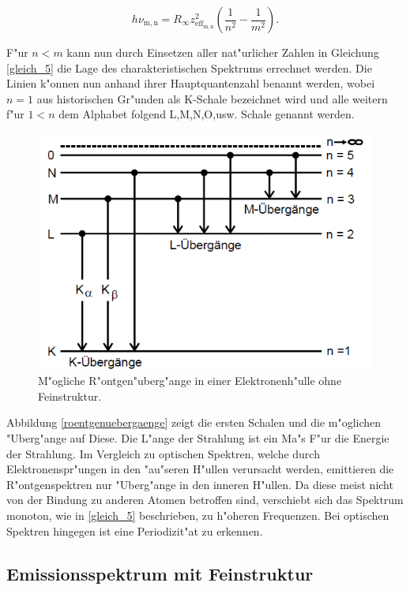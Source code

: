 		\begin{equation}
			h \nu_\mathrm{m,n} = R_\infty z_{\mathrm{eff}_\mathrm{m,n}}^2 \left( \frac{1}{n^2} - \frac{1}{m^2} \right). \label{gleich_5}
		\end{equation}

		F"ur $n < m$ kann nun durch Einsetzen aller nat"urlicher Zahlen in Gleichung \eqref{gleich_5} die Lage des charakteristischen Spektrums errechnet werden.
		Die Linien k"onnen nun anhand ihrer Hauptquantenzahl benannt werden, wobei $n = 1$ aus historischen Gr"unden als K-Schale bezeichnet wird und alle weitern f"ur $1 < n$ dem Alphabet folgend L,M,N,O,usw. Schale genannt werden. 

		\begin{figure}[htbp]
			\centering
			\includegraphics[width = 12cm]{img/Roentgenuebergaenge.png}
			\caption{M"ogliche R"ontgen"uberg"ange in einer Elektronenh"ulle ohne Feinstruktur.}
			\label{roentgenuebergaenge}
		\end{figure}

		Abbildung \eqref{roentgenuebergaenge} zeigt die ersten Schalen und die m"oglichen "Uberg"ange auf Diese. Die L"ange der Strahlung ist ein Ma"s F"ur die Energie der Strahlung.
		Im Vergleich zu optischen Spektren, welche durch Elektronenspr"ungen in den "au"seren H"ullen verursacht werden, emittieren die R"ontgenspektren nur "Uberg"ange in den inneren H"ullen.
		Da diese meist nicht von der Bindung zu anderen Atomen betroffen sind, verschiebt sich das Spektrum monoton, wie in \eqref{gleich_5} beschrieben, zu h"oheren Frequenzen.
		Bei optischen Spektren hingegen ist eine Periodizit"at zu erkennen.

	\subsection{Emissionsspektrum mit Feinstruktur}
	\label{sub:emissionsspektrum_mit_feinstruktur}
	
